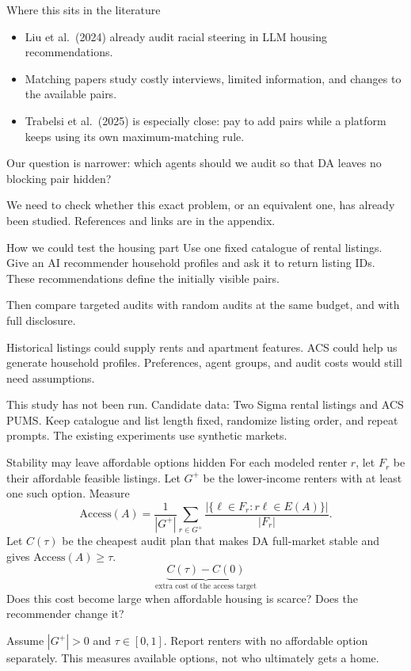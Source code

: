 \documentclass[aspectratio=169,14pt]{beamer}
\newcommand{\sources}[1]{\vfill{\fontsize{9}{11}\selectfont\color{muted}#1\par}}
\begin{document}
\begin{frame}[t]{Where this sits in the literature}
\small
\begin{itemize}
\setlength{\itemsep}{8pt}
\item Liu et al.\ (2024) already audit racial steering in LLM
housing recommendations.
\item Matching papers study costly interviews, limited information,
and changes to the available pairs.
\item Trabelsi et al.\ (2025) is especially close: pay to add pairs while
a platform keeps using its own maximum-matching rule.
\end{itemize}
\medskip
Our question is narrower: which agents should we audit so that
DA leaves no blocking pair hidden?
\sources{We need to check whether this exact problem, or an equivalent one,
has already been studied. References and links are in the appendix.}
\end{frame}

\begin{frame}[t]{How we could test the housing part}
\small
Use one fixed catalogue of rental listings. Give an AI recommender
household profiles and ask it to return listing IDs. These recommendations
define the initially visible pairs.

\medskip
Then compare targeted audits with random audits at the same budget,
and with full disclosure.

\medskip
Historical listings could supply rents and apartment features. ACS could
help us generate household profiles. Preferences, agent groups, and audit
costs would still need assumptions.

\sources{This study has not been run. Candidate data: Two Sigma rental listings
and ACS PUMS. Keep catalogue and list length fixed, randomize listing order,
and repeat prompts. The existing experiments use synthetic markets.}
\end{frame}

\begin{frame}[t]{Stability may leave affordable options hidden}
\small
For each modeled renter $r$, let $F_r$ be their affordable feasible listings.
Let $G^+$ be the lower-income renters with at least one such option. Measure
\[
 \mathrm{Access}(A)=\frac{1}{|G^+|}\sum_{r\in G^+}
 \frac{|\{\ell\in F_r:r\ell\in E(A)\}|}{|F_r|}.
\]
Let $C(\tau)$ be the cheapest audit plan that makes DA full-market stable
and gives $\mathrm{Access}(A)\geq\tau$.
\[
 \underbrace{C(\tau)-C(0)}_{\text{extra cost of the access target}}
\]
Does this cost become large when affordable housing is scarce?
Does the recommender change it?
\sources{Assume $|G^+|>0$ and $\tau\in[0,1]$. Report renters with no affordable
option separately. This measures available options, not who ultimately gets a home.}
\end{frame}
\end{document}
